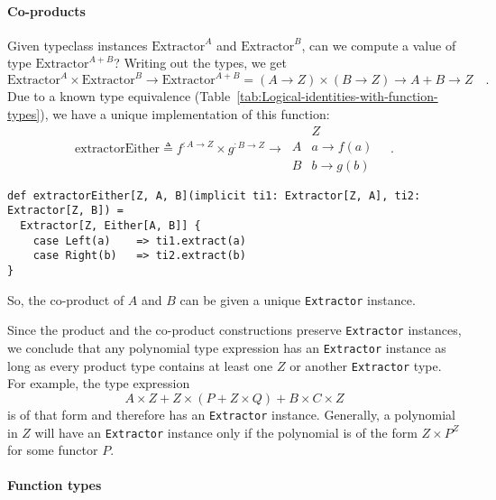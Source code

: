 \paragraph{Co-products}

Given typeclass instances $\text{Extractor}^{A}$ and $\text{Extractor}^{B}$,
can we compute a value of type $\text{Extractor}^{A+B}$? Writing
out the types, we get
\[
\text{Extractor}^{A}\times\text{Extractor}^{B}\rightarrow\text{Extractor}^{A+B}=\left(A\rightarrow Z\right)\times\left(B\rightarrow Z\right)\rightarrow A+B\rightarrow Z\quad.
\]
Due to a known type equivalence (Table~\ref{tab:Logical-identities-with-function-types}),
we have a unique implementation of this function:
\[
\text{extractorEither}\triangleq f^{:A\rightarrow Z}\times g^{:B\rightarrow Z}\rightarrow\,\begin{array}{|c||c|}
 & Z\\
\hline A & a\rightarrow f(a)\\
B & b\rightarrow g(b)
\end{array}\quad.
\]
\begin{lstlisting}
def extractorEither[Z, A, B](implicit ti1: Extractor[Z, A], ti2: Extractor[Z, B]) =
  Extractor[Z, Either[A, B]] {
    case Left(a)    => ti1.extract(a)
    case Right(b)   => ti2.extract(b)
}
\end{lstlisting}
So, the co-product of $A$ and $B$ can be given a unique \lstinline!Extractor!
instance.

Since the product and the co-product constructions preserve \lstinline!Extractor!
instances, we conclude that any polynomial type expression has an
\lstinline!Extractor! instance as long as every product type contains
at least one $Z$ or another \lstinline!Extractor! type. For example,
the type expression 
\[
A\times Z+Z\times(P+Z\times Q)+B\times C\times Z
\]
is of that form and therefore has an \lstinline!Extractor! instance.
Generally, a polynomial in $Z$ will have an \lstinline!Extractor!
instance only if the polynomial is of the form $Z\times P^{Z}$ for
some functor $P$.

\paragraph{Function types}

